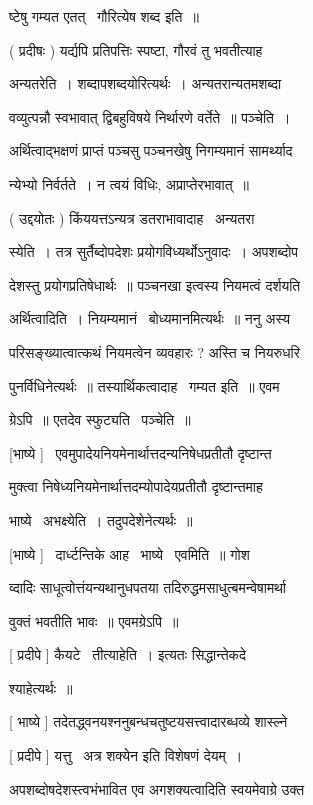 \documentclass[11pt, openany]{book}
\begin{document}
ष्टेषु गम्यत एतत् \textendash\ गौरित्येष शब्द इति~॥ 

( प्रदीषः ) यर्द्यपि प्रतिपत्तिः स्पष्टा, गौरवं तु भवतीत्याह \textendash\ 

अन्यतरेति~। शब्दापशब्दयोरित्यर्थः~। अन्यतरान्यतमशब्दा \textendash\ 

वव्युत्पन्नौ स्वभावात् द्विबहुविषये निर्थारणे वर्तेते~॥ पञ्चेति~। 

अर्थित्वाद्भक्षणं प्राप्तं पञ्चसु पञ्चनखेषु निगम्यमानं सामर्थ्याद \textendash\ 

न्येभ्यो निर्वर्तते~। न त्वयं विधिः, अप्राप्तेरभावात्~॥ 

( उद्दयोतः ) किंययत्तऽन्यत्र डतराभावादाह \textendash\ अन्यतरा \textendash\ 

स्येति~। तत्र सुर्तैब्दोपदेशः प्रयोगविध्यर्थोऽनुवादः~। अपशब्दोप \textendash\ 

देशस्तु प्रयोगप्रतिषेधार्थः~॥ पञ्चनखा इत्वस्य नियमत्वं दर्शयति \textendash\ 

अर्थित्वादिति~। नियम्यमानं \textendash\ बोध्यमानमित्यर्थः~॥ ननु अस्य 

परिसङ्ख्यात्वात्कथं नियमत्वेन व्यवहारः ? अस्ति च नियरुधरि \textendash\ 

पुनर्विधिनेत्यर्थः~॥ तस्यार्थिकत्वादाह \textendash\ गम्यत इति~॥ एवम \textendash\ 

ग्रेऽपि~॥ एतदेव स्फुट्यति \textendash\ पञ्चेति~॥ 

[भाष्ये ] \textendash\ एवमुपादेयनियमेनार्थात्तदन्यनिषेधप्रतीतौ दृष्टान्त \textendash\ 

मुक्त्वा निषेध्यनियमेनार्थात्तदम्योपादेयप्रतीतौ दृष्टान्तमाह \textendash\ 

भाष्ये \textendash\ अभक्ष्येति~। तदुपदेशेनेत्यर्थः~॥ 

[भाष्ये ] \textendash\ दार्ध्टन्तिके आह \textendash\ भाष्ये \textendash\ एवमिति~॥ गोश \textendash\ 

व्दादिः साधूत्वोत्तंयन्यथानुधपतया तदिरुद्धमसाधुत्बमन्वेषामर्था \textendash\ 

वुक्तं भवतीति भावः~॥ एवमग्रेऽपि~॥ 

[ प्रदीपे ] कैयटे \textendash\ तीत्याहेति~। इत्यतः सिद्धान्तेकदे \textendash\ 

श्याहेत्यर्थः~॥ 

[ भाष्ये ] तदेतद्ध्वनयश्ननुबन्धचतुष्टयसत्त्वादारब्धव्ये शास्ल्ने 

[ प्रदीपे ] यत्तु \textendash\ अत्र {\qt शक्येन} इति विशेषणं देयम्~। 

अपशब्दोषदेशस्त्वभंभावित एव अगशक्यत्वादिति स्वयमेवाग्रे उक्त \textendash\ 
\end{document}
